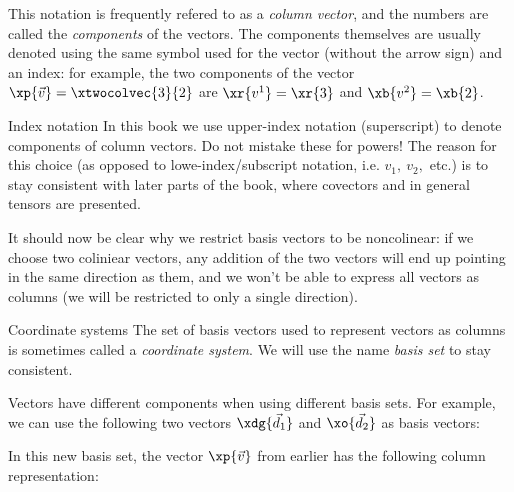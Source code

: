 This notation is frequently refered to as a \emph{column vector}, and the numbers are called the \emph{components} of the vectors. The components themselves are usually denoted using the same symbol used for the vector (without the arrow sign) and an index: for example, the two components of the vector $\xp{\vec{v}}=\xtwocolvec{3}{2}$ are $\xr{v^{1}}=\xr{3}$ and $\xb{v^{2}}=\xb{2}$.

\begin{note}{Index notation}{}
  In this book we use upper-index notation (superscript) to denote components of column vectors. Do not mistake these for powers! The reason for this choice (as opposed to lowe-index/subscript notation, i.e. $v_{1},\ v_{2},$ etc.) is to stay consistent with later parts of the book, where covectors and in general tensors are presented.
\end{note}

It should now be clear why we restrict basis vectors to be noncolinear: if we choose two coliniear vectors, any addition of the two vectors will end up pointing in the same direction as them, and we won't be able to express all vectors as columns (we will be restricted to only a single direction).

\begin{note}{Coordinate systems}{}
  The set of basis vectors used to represent vectors as columns is sometimes called a \emph{coordinate system}. We will use the name \emph{basis set} to stay consistent.
\end{note}

Vectors have different components when using different basis sets. For example, we can use the following two vectors $\xdg{\vec{d}_{1}}$ and $\xo{\vec{d}_{2}}$ as basis vectors:

\begin{center}
\end{center}

In this new basis set, the vector $\xp{\vec{v}}$ from earlier has the following column representation:

